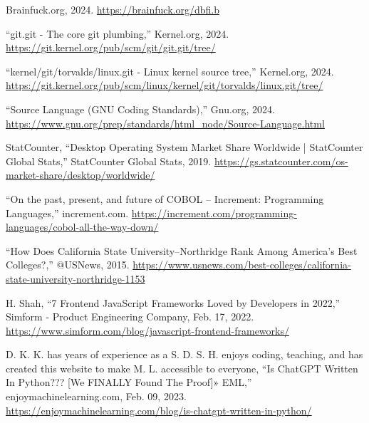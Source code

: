 \documentclass[12pt]{report} %
\begin{document}
\begin{singlespace}
\begin{thebibliography}{}
             Brainfuck.org, 2024. \href{https://brainfuck.org/dbfi.b}{https://brainfuck.org/dbfi.b}
            
             “git.git - The core git plumbing,” Kernel.org, 2024. \href{https://git.kernel.org/pub/scm/git/git.git/tree/}{https://git.kernel.org/pub/scm/git/git.git/tree/}

             “kernel/git/torvalds/linux.git - Linux kernel source tree,” Kernel.org, 2024. \href{https://git.kernel.org/pub/scm/linux/kernel/git/torvalds/linux.git/tree/}{https://git.kernel.org/pub/scm/linux/kernel/git/torvalds/linux.git/tree/}

              “Source Language (GNU Coding Standards),” Gnu.org, 2024. \href{https://www.gnu.org/prep/standards/html_node/Source-Language.html}{https://www.gnu.org/prep/standards/html\_node/Source-Language.html}
            
             StatCounter, “Desktop Operating System Market Share Worldwide | StatCounter Global Stats,” StatCounter Global Stats, 2019. \href{https://gs.statcounter.com/os-market-share/desktop/worldwide/}{https://gs.statcounter.com/os-market-share/desktop/worldwide/}
            
             “On the past, present, and future of COBOL – Increment: Programming Languages,” increment.com. \href{https://increment.com/programming-languages/cobol-all-the-way-down/}{https://increment.com/programming-languages/cobol-all-the-way-down/}

             “How Does California State University--Northridge Rank Among America’s Best Colleges?,” @USNews, 2015. \href{https://www.usnews.com/best-colleges/california-state-university-northridge-1153}{https://www.usnews.com/best-colleges/california-state-university-northridge-1153}

             H. Shah, “7 Frontend JavaScript Frameworks Loved by Developers in 2022,” Simform - Product Engineering Company, Feb. 17, 2022. \href{https://www.simform.com/blog/javascript-frontend-frameworks/}{https://www.simform.com/blog/javascript-frontend-frameworks/}

             D. K. K. has years of experience as a S. D. S. H. enjoys coding, teaching, and has created this website to make M. L. accessible to everyone, “Is ChatGPT Written In Python??? [We FINALLY Found The Proof]» EML,” enjoymachinelearning.com, Feb. 09, 2023. \href{https://enjoymachinelearning.com/blog/is-chatgpt-written-in-python/}{https://enjoymachinelearning.com/blog/is-chatgpt-written-in-python/}


\end{thebibliography}
\end{singlespace}
\end{document}
